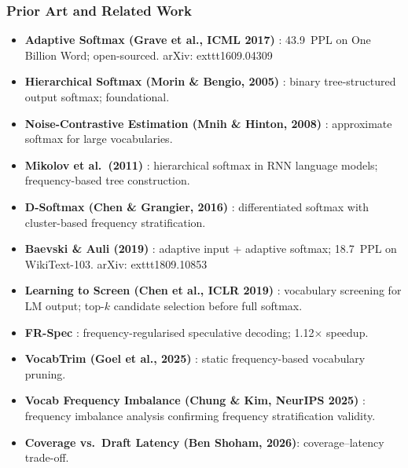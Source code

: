\documentclass[11pt]{article}
\begin{document}
\subsubsection*{Prior Art and Related Work}
\begin{itemize}
  \item \textbf{Adaptive Softmax (Grave et al., ICML 2017)} \cite{GraveEtAl2017}: 43.9~PPL on One Billion Word; open-sourced.
    arXiv:	exttt{1609.04309}

  \item \textbf{Hierarchical Softmax (Morin \& Bengio, 2005)} \cite{MorinBengio2005}: binary tree-structured output softmax; foundational.

  \item \textbf{Noise-Contrastive Estimation (Mnih \& Hinton, 2008)} \cite{MnihHinton2008}: approximate softmax for large vocabularies.

  \item \textbf{Mikolov et al.\ (2011)} \cite{Mikolov2011}: hierarchical softmax in RNN language models; frequency-based tree construction.

  \item \textbf{D-Softmax (Chen \& Grangier, 2016)} \cite{ChenGrangier2016}: differentiated softmax with cluster-based frequency stratification.

  \item \textbf{Baevski \& Auli (2019)} \cite{BaevskiAuli2019}: adaptive input + adaptive softmax; 18.7~PPL on WikiText-103.
    arXiv:	exttt{1809.10853}

  \item \textbf{Learning to Screen (Chen et al., ICLR 2019)} \cite{ChenEtAl2019}: vocabulary screening for LM output; top-$k$ candidate selection before full softmax.

  \item \textbf{FR-Spec} \cite{ZhaoEtAl2025FRSpec}: frequency-regularised speculative decoding; 1.12$\times$ speedup.

  \item \textbf{VocabTrim (Goel et al., 2025)} \cite{GoelEtAl2025}: static frequency-based vocabulary pruning.

  \item \textbf{Vocab Frequency Imbalance (Chung \& Kim, NeurIPS 2025)} \cite{ChungKim2025}: frequency imbalance analysis confirming frequency stratification validity.

  \item \textbf{Coverage vs.\ Draft Latency (Ben Shoham, 2026)}: coverage--latency trade-off.
\end{itemize}
\end{document}
